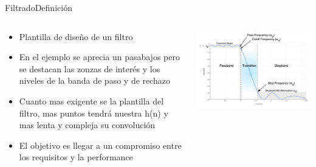 \begin{frame}[t]{Filtrado}{Definición}
   \begin{columns}[t]
      \footnotesize
      \begin{column}{.4\textwidth}
         \begin{itemize}
            \item{Plantilla de diseño de un filtro}
            \item{En el ejemplo se aprecia un pasabajos pero se destacan las zonzas de interés y los niveles de la banda de paso y de rechazo}
            \item{Cuanto mas exigente se la plantilla del filtro, mas puntos tendrá nuestra h(n) y mas lenta y compleja su convolución}
            \item{El objetivo es llegar a un compromiso entre los requisitos y la performance }
         \end{itemize}
      \end{column}
      \hspace{2pt}
      \vrule
      \hspace{2pt}
      \begin{column}{.6\textwidth}
         \center\includegraphics[width=1.0\textwidth]{5_clase/pyfda3}
      \end{column}
      \hspace{2pt}
   \end{columns}
   \vfill
\end{frame}
